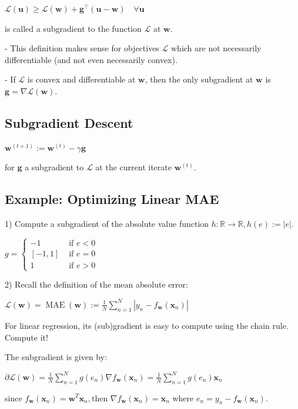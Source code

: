 $
\mathcal{L}(\mathbf{u}) \geq \mathcal{L}(\mathbf{w})+\mathbf{g}^{\top}(\mathbf{u}-\mathbf{w}) \quad \forall \mathbf{u}
$

is called a subgradient to the function $\mathcal{L}$ at $\mathbf{w}$.

- This definition makes sense for objectives $\mathcal{L}$ which are not necessarily differentiable (and not even necessarily convex).

- If $\mathcal{L}$ is convex and differentiable at $\mathbf{w}$, then the only subgradient at $\mathbf{w}$ is $\mathbf{g}=\nabla \mathcal{L}(\mathbf{w})$.

\subsection*{Subgradient Descent}
$
\mathbf{w}^{(t+1)}:=\mathbf{w}^{(t)}-\gamma \mathbf{g}
$

for $\mathbf{g}$ a subgradient to $\mathcal{L}$ at the current iterate $\mathbf{w}^{(t)}$.

\subsection*{Example: Optimizing Linear MAE}
1) Compute a subgradient of the absolute value function
$h: \mathbb{R} \rightarrow \mathbb{R}, h(e):=|e|$.

$g=\left\{\begin{array}{cc}-1 & \text { if } e<0 \\ {[-1,1]} & \text { if } e=0 \\ 1 & \text { if } e>0\end{array}\right.$

2) Recall the definition of the mean absolute error:

$\mathcal{L}(\mathbf{w})=\operatorname{MAE}(\mathbf{w}):=\frac{1}{N} \sum_{n=1}^{N}\left|y_{n}-f_{\mathbf{w}}\left(\mathbf{x}_{n}\right)\right|$

For linear regression, its (sub)gradient is easy to compute using the chain rule. Compute it!

The subgradient is given by:

$
\partial\mathcal{L}(\mathbf{w})=\frac1N\sum_{n=1}^Ng(e_n)\nabla f_\mathbf{w}(\mathbf{x}_n) = \frac{1}{N} \sum_{n=1}^{N} g(e_n) \mathbf{x}_n
$

since $f_\mathbf{w}(\mathbf{x}_n)=\mathbf{w}^T\mathbf{x}_n,\text{then }\nabla f_\mathbf{w}(\mathbf{x}_n)=\mathbf{x}_n$
where \(e_n = y_n - f_{\mathbf{w}}(\mathbf{x}_n)\).

